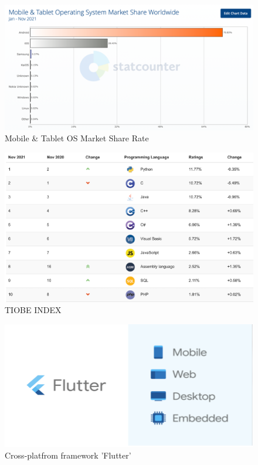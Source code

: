 \documentclass[conference]{IEEEtran}
\begin{document}
\begin{figure}[h]
\centerline{\includegraphics[scale=0.9]{assets/그림1.png}}
\caption{Mobile \& Tablet OS Market Share Rate}
\label{fig}
\end{figure}

\begin{figure}[]
\centerline{\includegraphics[scale=0.9]{assets/그림12png.png}}
\caption{TIOBE INDEX}
\label{fig}
\end{figure}

\begin{figure}[h]
\centerline{\includegraphics[scale=0.9]{assets/flutter.png}}
\caption{Cross-platfrom framework 'Flutter'}
\label{fig}
\end{figure}
\break
\end{document}
